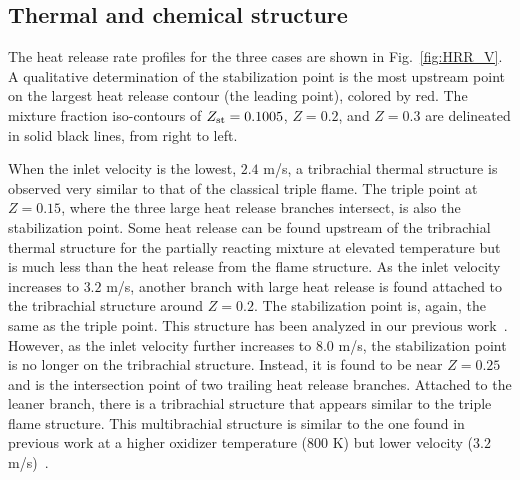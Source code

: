 \documentclass[review,3p,times]{elsarticle}
\begin{document}
\begin{table}
  \caption{Computational domain and number of grid points.}
  \label{table:domain_V}
  \centering
  \normalsize
\end{table}

\subsection{Thermal and chemical structure}  
The heat release rate profiles for the three cases are shown in Fig.~\ref{fig:HRR_V}.  A qualitative determination of the stabilization point is the most upstream point on the largest heat release contour (the leading point), colored by red.  The mixture fraction iso-contours of $Z_{\rm st} = 0.1005$, $Z = 0.2$, and $Z = 0.3$ are delineated in solid black lines, from right to left.

When the inlet velocity is the lowest, $2.4$ m/s, a tribrachial thermal structure is observed very similar to that of the classical triple flame.  The triple point at $Z = 0.15$, where the three large heat release branches intersect, is also the stabilization point.  Some heat release can be found upstream of the tribrachial thermal structure for the partially reacting mixture at elevated temperature but is much less than the heat release from the flame structure.  As the inlet velocity increases to $3.2$ m/s, another branch with large heat release is found attached to the tribrachial structure around $Z = 0.2$.  The stabilization point is, again, the same as the triple point.  This structure has been analyzed in our previous work~\cite{deng15}.  However, as the inlet velocity further increases to $8.0$ m/s, the stabilization point is no longer on the tribrachial structure.  Instead, it is found to be near $Z = 0.25$ and is the intersection point of two trailing heat release branches.  Attached to the leaner branch, there is a tribrachial structure that appears similar to the triple flame structure.  This multibrachial structure is similar to the one found in previous work at a higher oxidizer temperature ($800$ K) but lower velocity ($3.2$ m/s)~\cite{deng15}.
\end{document}

